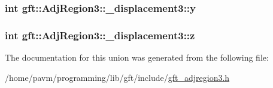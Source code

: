 \hypertarget{uniongft_1_1AdjRegion3_1_1__displacement3_ae5f88f74ade7acc6cc97a8ba8537a8c8}{
\subsubsection[{y}]{\setlength{\rightskip}{0pt plus 5cm}int gft\-::\-Adj\-Region3\-::\-\_\-displacement3\-::y}}\label{uniongft_1_1AdjRegion3_1_1__displacement3_ae5f88f74ade7acc6cc97a8ba8537a8c8}
\hypertarget{uniongft_1_1AdjRegion3_1_1__displacement3_a05b4db47be0e60b35bf377f9af225edf}{
\subsubsection[{z}]{\setlength{\rightskip}{0pt plus 5cm}int gft\-::\-Adj\-Region3\-::\-\_\-displacement3\-::z}}\label{uniongft_1_1AdjRegion3_1_1__displacement3_a05b4db47be0e60b35bf377f9af225edf}


The documentation for this union was generated from the following file\-:\begin{DoxyCompactItemize}
\item 
/home/pavm/programming/lib/gft/include/\hyperlink{gft__adjregion3_8h}{gft\-\_\-adjregion3.\-h}\end{DoxyCompactItemize}

